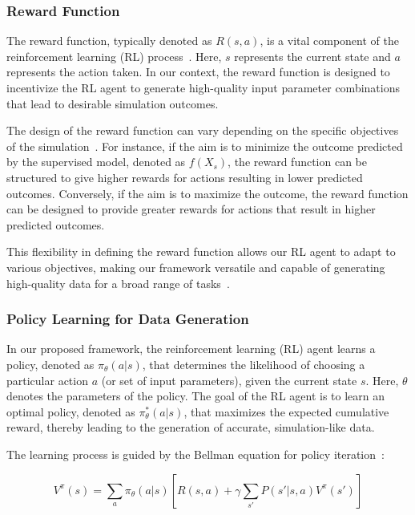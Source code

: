 \documentclass{article}
\begin{document}
\subsubsection{Reward Function}

The reward function, typically denoted as $R(s,a)$, is a vital component of the reinforcement learning (RL) process~\citep{abbeel2004apprenticeship, brunskill2013sample, ng2000algorithms}. Here, $s$ represents the current state and $a$ represents the action taken. In our context, the reward function is designed to incentivize the RL agent to generate high-quality input parameter combinations that lead to desirable simulation outcomes.

The design of the reward function can vary depending on the specific objectives of the simulation~\cite{abbeel2004apprenticeship}. For instance, if the aim is to minimize the outcome predicted by the supervised model, denoted as $f(X_s)$, the reward function can be structured to give higher rewards for actions resulting in lower predicted outcomes. Conversely, if the aim is to maximize the outcome, the reward function can be designed to provide greater rewards for actions that result in higher predicted outcomes.

This flexibility in defining the reward function allows our RL agent to adapt to various objectives, making our framework versatile and capable of generating high-quality data for a broad range of tasks~\citep{sutton2018reinforcement, mnih2015human, lapan2018deep, karpathy2016deep}.

\subsubsection{Policy Learning for Data Generation}

In our proposed framework, the reinforcement learning (RL) agent learns a policy, denoted as $\pi_{\theta}(a|s)$, that determines the likelihood of choosing a particular action $a$ (or set of input parameters), given the current state $s$. Here, $\theta$ denotes the parameters of the policy. The goal of the RL agent is to learn an optimal policy, denoted as $\pi^*_{\theta}(a|s)$, that maximizes the expected cumulative reward, thereby leading to the generation of accurate, simulation-like data.

The learning process is guided by the Bellman equation for policy iteration~\cite{sutton2018reinforcement}:

\begin{equation}
    V^\pi(s) = \sum_{a} \pi_{\theta}(a|s) \left[R(s,a) + \gamma \sum_{s'} P(s'|s,a) V^\pi(s')\right]
\end{equation}
\end{document}
